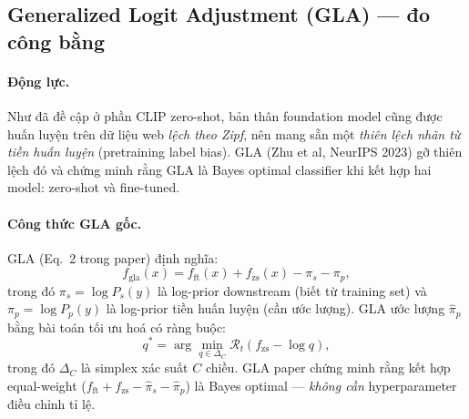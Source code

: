 \subsection{Generalized Logit Adjustment (GLA) --- đo công bằng}
\paragraph{Động lực.}
Như đã đề cập ở phần CLIP zero-shot, bản thân foundation model cũng được huấn luyện trên dữ liệu web
\emph{lệch theo Zipf}, nên mang sẵn một \emph{thiên lệch nhãn từ tiền huấn luyện} (pretraining label
bias). GLA \cite{zhu2023gla} (Zhu et al, NeurIPS 2023) gỡ thiên lệch đó và chứng minh rằng GLA là Bayes optimal
classifier khi kết hợp hai model: zero-shot và fine-tuned.
 
\paragraph{Công thức GLA gốc.}
GLA (Eq.~2 trong paper) định nghĩa:
\[
  f_{\text{gla}}(x) = f_{\text{ft}}(x) + f_{\text{zs}}(x) - \pi_s - \pi_p,
\]
trong đó $\pi_s = \log P_s(y)$ là log-prior downstream (biết từ training set) và $\pi_p = \log P_p(y)$
là log-prior tiền huấn luyện (cần ước lượng). GLA ước lượng $\hat\pi_p$ bằng bài toán tối ưu hoá có
ràng buộc:
\[
  q^* = \arg\min_{q \in \Delta_C} \mathcal{R}_t(f_{\text{zs}} - \log q),
\]
trong đó $\Delta_C$ là simplex xác suất $C$ chiều. GLA paper chứng minh rằng kết hợp equal-weight
($f_{\text{ft}} + f_{\text{zs}} - \hat\pi_s - \hat\pi_p$) là Bayes optimal --- \emph{không cần}
hyperparameter điều chỉnh tỉ lệ.

